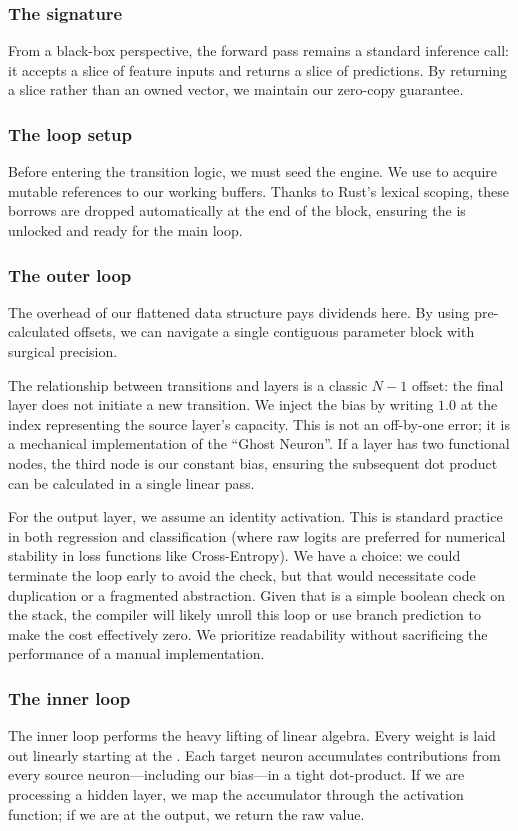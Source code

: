 \subsubsection{The signature}
From a black-box perspective, the forward pass remains a standard inference call: it accepts a slice of feature inputs and returns a slice of predictions. By returning a slice rather than an owned vector, we maintain our zero-copy guarantee.
\subsubsection{The loop setup}
Before entering the transition logic, we must seed the engine. We use  to acquire mutable references to our working buffers. Thanks to Rust’s lexical scoping, these borrows are dropped automatically at the end of the block, ensuring the  is unlocked and ready for the main loop.
\subsubsection{The outer loop}
The overhead of our flattened data structure pays dividends here. By using pre-calculated offsets, we can navigate a single contiguous parameter block with surgical precision.\par
The relationship between transitions and layers is a classic $N-1$ offset: the final layer does not initiate a new transition. We inject the bias by writing $1.0$ at the index representing the source layer's capacity. This is not an off-by-one error; it is a mechanical implementation of the \enquote{Ghost Neuron}. If a layer has two functional nodes, the third node is our constant bias, ensuring the subsequent dot product can be calculated in a single linear pass.\par
For the output layer, we assume an identity activation. This is standard practice in both regression and classification (where raw logits are preferred for numerical stability in loss functions like Cross-Entropy). We have a choice: we could terminate the loop early to avoid the  check, but that would necessitate code duplication or a fragmented abstraction. Given that  is a simple boolean check on the stack, the compiler will likely unroll this loop or use branch prediction to make the cost effectively zero. We prioritize readability without sacrificing the performance of a manual implementation.
\subsubsection{The inner loop}
The inner loop performs the heavy lifting of linear algebra. Every weight is laid out linearly starting at the . Each target neuron accumulates contributions from every source neuron—including our bias—in a tight dot-product. If we are processing a hidden layer, we map the accumulator through the activation function; if we are at the output, we return the raw value.
